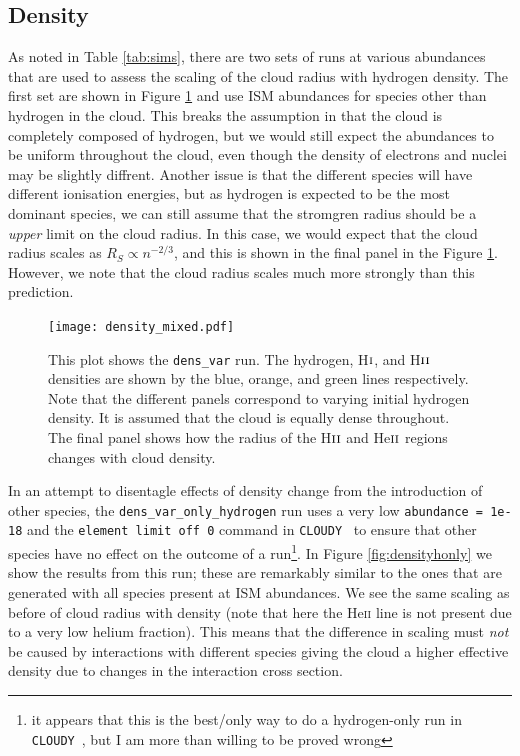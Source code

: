 \documentclass[a4paper]{article}
\newcommand{\cloudy}{{\tt CLOUDY}~}
\begin{document}
\subsection{Density}

As noted in Table \ref{tab:sims}, there are two sets of runs at various
abundances that are used to assess the scaling of the cloud radius with
hydrogen density. The first set are shown in Figure \ref{fig:density} and use
ISM abundances for species other than hydrogen in the cloud. This breaks the
assumption in \citet{stromgren_physical_1939} that the cloud is completely
composed of hydrogen, but we would still expect the abundances to be uniform
throughout the cloud, even though the density of electrons and nuclei may be
slightly diffrent. Another issue is that the different species will have
different ionisation energies, but as hydrogen is expected to be the most
dominant species, we can still assume that the stromgren radius should be a
\emph{upper} limit on the cloud radius. In this case, we would expect that the
cloud radius scales as $R_S \propto n^{-2/3}$, and this is shown in the final 
panel in the Figure \ref{fig:density}. However, we note that the cloud radius
scales much more strongly than this prediction.

\begin{figure}[!h]
\centering
\texttt{[image: density\_mixed.pdf]}
    \caption{This plot shows the {\tt dens\_var} run.
        The hydrogen, H$\textsc{i}$, and H$\textsc{ii}$ densities are shown by
        the blue, orange, and green lines respectively. Note that the different
        panels correspond to varying initial hydrogen density. It is assumed
        that the cloud is equally dense throughout. The final panel shows how
        the radius of the H$\textsc{ii}$ and He$\textsc{ii}$ regions changes
        with cloud density.}
    \label{fig:density}
\end{figure}
In an attempt to disentagle effects of density change from the introduction
of other species, the {\tt dens\_var\_only\_hydrogen} run uses a very low
{\tt abundance = 1e-18} and the {\tt element limit off 0} command in \cloudy
to ensure that other species have no effect on the outcome of a run\footnote{
    it appears that this is the best/only way to do a hydrogen-only run in 
    \cloudy, but I am more than willing to be proved wrong}.
In Figure \ref{fig:densityhonly} we show the results from this run; these
are remarkably similar to the ones that are generated with all species present
at ISM abundances. We see the same scaling as before of cloud radius with
density (note that here the He\textsc{ii} line is not present due to a very
low helium fraction). This means that the difference in scaling must \emph{not}
be caused by interactions with different species giving the cloud a higher 
effective density due to changes in the interaction cross section.
\end{document}
